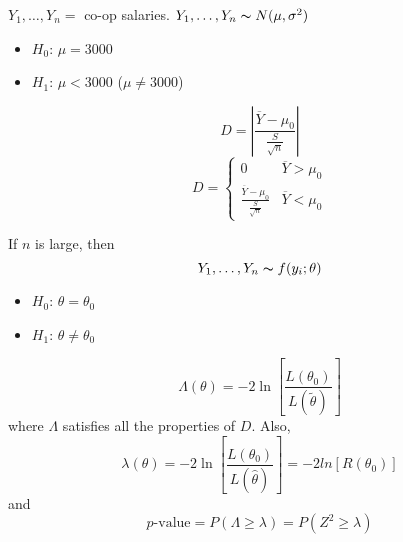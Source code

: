 \begin{exbox}
    \begin{example}
        $ Y_1,\ldots ,Y_n = $ co-op salaries. $ Y_1,\ldots ,Y_n \thicksim N(\mu,\sigma^2) $
        \begin{itemize}
            \item $ H_0 $: $ \mu=3000 $
            \item $ H_1 $: $ \mu<3000 $ ($ \mu\neq 3000 $)
        \end{itemize}
        \[ D=\left|\frac{\overline{Y}-\mu_0}{\frac{S}{\sqrt{n}}} \right| \]
        \[ D=
            \begin{cases}
                0                                             & \overline{Y}>\mu_0 \\
                \frac{\overline{Y}-\mu_0}{\frac{S}{\sqrt{n}}} & \overline{Y}<\mu_0
            \end{cases} \]
    \end{example}
\end{exbox}
If $ n $ is large, then
\[ Y_1,\ldots ,Y_n \thicksim f(y_i;\theta) \]
\begin{itemize}
    \item $ H_0 $: $ \theta=\theta_0 $
    \item $ H_1 $: $ \theta\neq \theta_0 $
\end{itemize}
\[ \Lambda(\theta)=-2\ln\left[ \frac{L(\theta_0)}{L(\tilde{\theta})} \right] \]
where $ \Lambda $ satisfies all the properties of $ D $. Also,
\[ \lambda(\theta)=-2\ln\left[ \frac{L(\theta_0)}{L(\hat{\theta})}\right] =-2ln\left[ R(\theta_0) \right] \]
and
\[ p\text{-value}=P(\Lambda\geqslant \lambda)=P(Z^2\geqslant \lambda) \]
